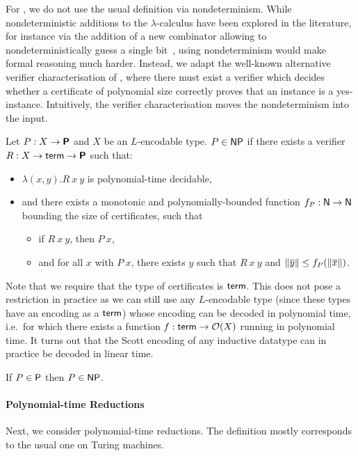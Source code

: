 For \NP{}, we do not use the usual definition via nondeterminism. While nondeterministic additions to the $\lambda$-calculus have been explored in the literature, for instance via the addition of a new combinator allowing to nondeterministically guess a single bit~\cite{kutzner:nondet_lambda}, using nondeterminism would make formal reasoning much harder.
Instead, we adapt the well-known alternative verifier characterisation of \NP{}, where there must exist a verifier which decides whether a certificate of polynomial size correctly proves that an instance is a yes-instance. Intuitively, the verifier characterisation moves the nondeterminism into the input.
\begin{definition}[\NP{}]
  Let $P : X \rightarrow \textsf{\bfseries P}$ and $X$ be an $L$-encodable type. $P \in \normalfont{\textsf{NP}{}}$ if there exists a verifier $R : X \rightarrow \textsf{term} \rightarrow \textsf{\bfseries P}$ such that: 
  \begin{itemize}
    \item $\lambda (x, y). R~x~y$ is polynomial-time decidable, 
    \item and there exists a monotonic and polynomially-bounded function $f_P : \mathsf{N} \rightarrow \mathsf{N}$ bounding the size of certificates, such that
      \begin{itemize}
        \item if $R~x~y$, then $P~x$, 
        \item and for all $x$ with $P~x$, there exists $y$ such that $R~x~y$ and $\left\lVert\overline{y}\right\rVert \le f_P(\left\lVert\overline{x}\right\rVert)$.
      \end{itemize}
  \end{itemize}
\end{definition}

Note that we require that the type of certificates is $\textsf{term}$. This does not pose a restriction in practice as we can still use any $L$-encodable type (since these types have an encoding as a $\textsf{term}$) whose encoding can be decoded in polynomial time, i.e.\ for which there exists a function $f : \textsf{term} \rightarrow \mathcal{O}{(X)}$ running in polynomial time. It turns out that the Scott encoding of any inductive datatype can in practice be decoded in linear time.

\begin{fact}
  If $P \in \normalfont{\textsf{P}}$ then $P \in \textsf{NP}{}$. 
\end{fact}

\paragraph{Polynomial-time Reductions}
Next, we consider polynomial-time reductions. The definition mostly corresponds to the usual one on Turing machines. 

